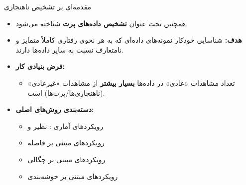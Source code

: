 \begin{frame}{مقدمه‌ای بر تشخیص ناهنجاری}{}
  \begin{itemize}
    \setlength{\itemsep}{6pt}
    \item همچنین تحت عنوان \textbf{تشخیص داده‌های پرت } شناخته می‌شود.
    \item \textbf{هدف:} شناسایی خودکار نمونه‌های داده‌ای که به هر نحوی رفتاری کاملاً متمایز و نامتعارف نسبت به سایر داده‌ها دارند.
    \item \textbf{فرض بنیادی کار:}
    \begin{itemize}
      \item تعداد مشاهدات «عادی» در داده‌ها \textbf{بسیار بیشتر} از مشاهدات «غیرعادی» (ناهنجاری‌ها/پرت‌ها) است.
    \end{itemize}
    \item \textbf{دسته‌بندی روش‌های اصلی:}
    \begin{itemize}
      \setlength{\itemsep}{2pt}
      \item رویکردهای آماری : نظیر  و 
      \item رویکردهای مبتنی بر فاصله 
      \item رویکردهای مبتنی بر چگالی 
      \item رویکردهای مبتنی بر خوشه‌بندی 
    \end{itemize}
  \end{itemize}
\end{frame}

